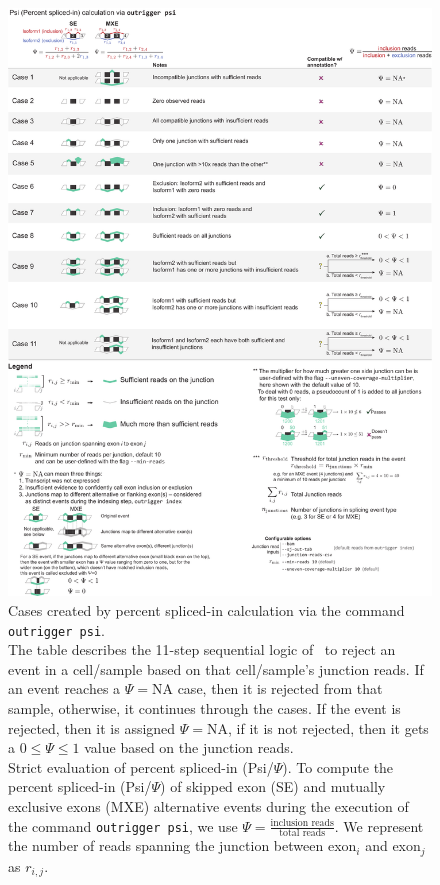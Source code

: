 \begin{figure}
  \centering
  \includegraphics[width=5.8in]{figures/outrigger_psi}
  \caption[Cases created by percent spliced-in calculation via the command \texttt{outrigger psi}.]{
  Cases created by percent spliced-in calculation via the command \texttt{outrigger psi}.\\
The table describes the 11-step sequential logic of \outrigger\, to reject an event in a cell/sample based on that cell/sample's junction reads. If an event reaches a $\Psi=\text{NA}$ case, then it is rejected from that sample, otherwise, it continues through the cases. If the event is rejected, then it is assigned $\Psi = \text{NA}$, if it is not rejected, then it gets a $0\leq \Psi \leq 1$ value based on the junction reads.\\
Strict evaluation of percent spliced-in (Psi/$\Psi$). To compute the percent spliced-in (Psi/$\Psi$) of skipped exon (SE) and mutually exclusive exons (MXE) alternative events during the execution of the command \texttt{outrigger psi}, we use $\Psi= \frac{\text{inclusion reads}}{\text{total reads}}$. We represent the number of reads spanning the junction between exon$_i$ and exon$_j$ as $r_{i,j}$.
}
\end{figure}
